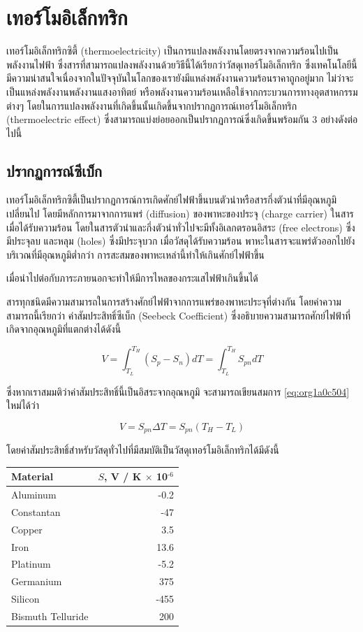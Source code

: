 \documentclass[a4paper,nobib,openany]{tufte-book}
\begin{document}
\chapter{เทอร์โมอิเล็กทริก}
\label{sec:orge4025e1}
เทอร์โมอิเล็กทริกซิตี้ (thermoelectricity) เป็นการแปลงพลังงานโดยตรงจากความร้อนไปเป็นพลังงานไฟฟ้า
ซึ่งสารที่สามารถแปลงพลังงานด้วยวิธีนี้ได้เรียกว่าวัสดุเทอร์โมอิเล็กทริก
ซึ่งเทคโนโลยีนี้มีความน่าสนใจเนื่องจากในปัจจุบันในโลกของเรายังมีแหล่งพลังงานความร้อนราคาถูกอยู่มาก
ไม่ว่าจะเป็นแหล่งพลังงานพลังงานแสงอาทิตย์ หรือพลังงานความร้อนเหลือใช้จากกระบวนการทางอุตสาหกรรมต่างๆ
โดยในการแปลงพลังงานที่เกิดขึ้นนั้นเกิดขึ้นจากปรากฏการณ์เทอร์โมอิเล็กทริก
(thermoelectric effect)
ซึ่งสามารถแบ่งย่อยออกเป็นปรากฏการณ์ซึ่งเกิดขึ้นพร้อมกัน 3
อย่างดังต่อไปนี้

\section{ปรากฏการณ์ซีเบ็ก}
\label{sec:org7684623}
เทอร์โมอิเล็กทริกซิตี้เป็นปรากฏการณ์การเกิดศักย์ไฟฟ้าขึ้นบนตัวนำหรือสารกึ่งตัวนำที่มีอุณหภูมิเปลี่ยนไป
โดยมีหลักการมาจากการแพร่ (diffusion) ของพาหะของประจุ (charge carrier)
ในสารเมื่อได้รับความร้อน
โดยในสารตัวนำและกึ่งตัวนำทั่วไปจะมีทั้งอิเลกตรอนอิสระ (free electrons)
ซึ่งมีประจุลบ และหลุม (holes) ซึ่งมีประจุบวก เมื่อวัสดุได้รับความร้อน
พาหะในสารจะแพร่ตัวออกไปยังบริเวณที่มีอุณหภูมิต่ำกว่า
การสะสมของพาหะเหล่านี้ทำให้เกินศักย์ไฟฟ้าขึ้น

เมื่อนำไปต่อกับภาระภายนอกจะทำให้มีการไหลของกระแสไฟฟ้าเกินขึ้นได้

สารทุกชนิดมีความสามารถในการสร้างศักย์ไฟฟ้าจากการแพร่ของพาหะประจุที่ต่างกัน
โดยค่าความสามารถนี้เรียกว่า ค่าสัมประสิทธิ์ซีเบ็ก (Seebeck Coefficient)
ซึ่งอธิบายความสามารถศักย์ไฟฟ้าที่เกิดจากอุณหภูมิที่แตกต่างได้ดังนี้

\begin{equation}
\label{eq:org1a0c504}
  V = \int_{T_L}^{T_H} \left( S_p - S_n \right) dT = \int_{T_L}^{T_H} S_{pn} dT
\end{equation}

ซึ่งหากเราสมมติว่าค่าสัมประสิทธิ์นี้เป็นอิสระจากอุณหภูมิ จะสามารถเขียนสมการ \ref{eq:org1a0c504} ใหม่ได้ว่า

\[V = S_{pn} \Delta T = S_{pn} \left( T_H - T_L \right)\]

โดยค่าสัมประสิทธิ์สำหรับวัสดุทั่วไปที่มีสมบัติเป็นวัสดุเทอร์โมอิเล็กทริกได้มีดังนี้

\begin{center}
\begin{tabular}{lr}
\toprule
Material & \(S\), V / K \(\times\) 10\(^{\text{-6}}\)\\
\midrule
Aluminum & -0.2\\
Constantan & -47\\
Copper & 3.5\\
Iron & 13.6\\
Platinum & -5.2\\
Germanium & 375\\
Silicon & -455\\
Bismuth Telluride & 200\\
\bottomrule
\end{tabular}
\end{center}
\end{document}

